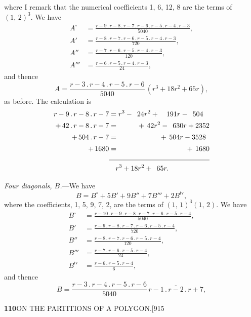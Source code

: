 \documentclass[11pt]{article}
\begin{document}
\smallskip
where I remark that the numerical coefficients 1, 6, 12, 8 are the terms of
$(1,\,2)^{3}$. We have
\begin{align*}
A^{\circ} &= \frac{r-9\,.\,r-8\,.\,r-7\,.\,r-6\,.\,r-5\,.\,r-4\,.\,r-3}{5040},\\[4pt]
A' &= \frac{r-8\,.\,r-7\,.\,r-6\,.\,r-5\,.\,r-4\,.\,r-3}{720},\\[4pt]
A'' &= \frac{r-7\,.\,r-6\,.\,r-5\,.\,r-4\,.\,r-3}{120},\\[4pt]
A''' &= \frac{r-6\,.\,r-5\,.\,r-4\,.\,r-3}{24},
\end{align*}
and thence
\[
A=\frac{r-3\,.\,r-4\,.\,r-5\,.\,r-6}{5040}\,(r^{3}+18r^{2}+65r),
\]
as before. The calculation is
\begin{align*}
r-9\,.\,r-8\,.\,r-7 &= r^{3}-\phantom{0}24r^{2}+\phantom{00}191r-\phantom{0}504\\
+\,42\,.\,r-8\,.\,r-7 &= \phantom{r^{3}-2}+\,42r^{2}-\phantom{0}630r+2352\\
+\,504\,.\,r-7 &= \phantom{r^{3}-24r^{2}+1}+\,504r-3528\\
+\,1680 &= \phantom{r^{3}-24r^{2}+191r-50}+\,1680\\[-2pt]
\cline{2-2}
&\phantom{=\,}r^{3}+18r^{2}+\phantom{0}65r.
\end{align*}

\hspace{1em} \emph{Four diagonals, $B$.}---We have
\[
B=B^{\circ}+5B'+9B''+7B'''+2B^{\mathrm{iv}},
\]
where the coefficients, 1, 5, 9, 7, 2, are the terms of $(1,\,1)^{3}(1,\,2)$.
We have
\begin{align*}
B^{\circ} &= \frac{r-10\,.\,r-9\,.\,r-8\,.\,r-7\,.\,r-6\,.\,r-5\,.\,r-4}{5040},\\[4pt]
B' &= \frac{r-9\,.\,r-8\,.\,r-7\,.\,r-6\,.\,r-5\,.\,r-4}{720},\\[4pt]
B'' &= \frac{r-8\,.\,r-7\,.\,r-6\,.\,r-5\,.\,r-4}{120},\\[4pt]
B''' &= \frac{r-7\,.\,r-6\,.\,r-5\,.\,r-4}{24},\\[4pt]
B^{\mathrm{iv}} &= \frac{r-6\,.\,r-5\,.\,r-4}{6},
\end{align*}
and thence
\[
B=\frac{r-3\,.\,r-4\,.\,r-5\,.\,r-6}{5040}\,\overline{r-1\,.\,r-2\,.\,r+7},
\]

\newpage
\noindent\textbf{110}\hfill ON THE PARTITIONS OF A POLYGON.\hfill[915
\end{document}
